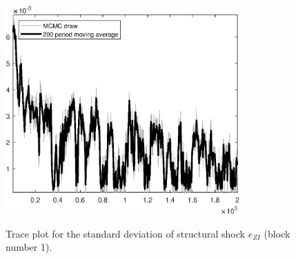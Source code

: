 \begin{figure}[H]
\centering
  \includegraphics[width=0.8\textwidth]{BRS_sectoral_rest/graphs/TracePlot_SE_e_ZI_blck_1}\\
    \caption{Trace plot for the standard deviation of structural shock ${e_{ZI}}$ (block number 1).}
\end{figure}

